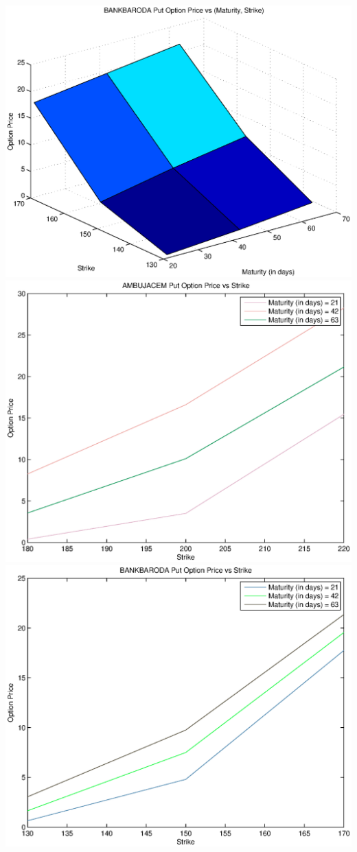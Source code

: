 \documentclass{article}
\begin{document}
\includegraphics[width=\textwidth]{BANKBARODA_Put_Option_Price_vs_(Maturity,_Strike)} \\
\includegraphics[width=\textwidth]{AMBUJACEM_Put_Option_Price_vs_Strike} \\                
\includegraphics[width=\textwidth]{BANKBARODA_Put_Option_Price_vs_Strike} \\
\end{document}
